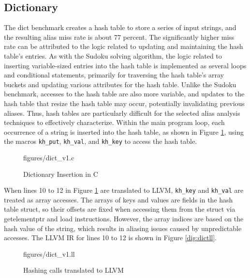 \subsection{Dictionary}
The dict benchmark creates a hash table to store a series of input strings, and the resulting alias miss rate is about 77 percent. The significantly higher miss rate can be attributed to the logic related to updating and maintaining the hash table's entries. As with the Sudoku solving algorithm, the logic related to inserting variable-sized entries into the hash table is implemented as several loops and conditional statements, primarily for traversing the hash table's array buckets and updating various attributes for the hash table. Unlike the Sudoku benchmark, accesses to the hash table are also more variable, and updates to the hash table that resize the hash table may occur, potentially invalidating previous aliases. Thus, hash tables are particularly difficult for the selected alias analysis techniques to effectively characterize. Within the main program loop, each occurrence of a string is inserted into the hash table, as shown in Figure \ref{fig:dictc}, using the macros \texttt{kh\_put}, \texttt{kh\_val}, and \texttt{kh\_key} to access the hash table.

\begin{figure} [h]
   {figures/dict_v1.c}
  \caption{Dictionary Insertion in C}
  \label{fig:dictc}
\end{figure}

When lines 10 to 12 in Figure \ref{fig:dictc} are translated to LLVM, \texttt{kh\_key} and \texttt{kh\_val} are treated as array accesses. The arrays of keys and values are fields in the hash table struct, so their offsets are fixed when accessing them from the struct via getelementptr and load instructions. However, the array indices are based on the hash value of the string, which results in aliasing issues caused by unpredictable accesses. The LLVM IR for lines 10 to 12 is shown in Figure \ref{dig:dictll}.

\begin{figure} [h]
   {figures/dict_v1.ll}
  \caption{Hashing calls translated to LLVM}
  \label{fig:dictll}
\end{figure}

